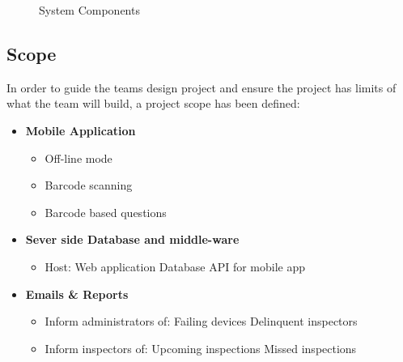 \documentclass[Letter,11pt]{article}
\begin{document}
	\begin{figure}[h]
		\centering
		
		\caption{\label{sysConn} System Components}
	\end{figure}
	
	\subsection{Scope}\label{scope}
	In order to guide the teams design project and ensure the project has limits of what the team will build, a project scope has been defined:
	\\
	\begin{minipage}[t]{0.5\textwidth}
		\begin{itemize}
			\item \textbf{Mobile Application}
			\begin{itemize}
				\item Off-line mode
				\item Barcode scanning
				\item Barcode based questions
			\end{itemize}
			\item \textbf{Sever side Database and middle-ware}
			\begin{itemize}
				\item Host:
					\subitem Web application
					\subitem Database API for mobile app
			\end{itemize}
			\item\textbf{ Emails \& Reports}
			\begin{itemize}
				\item Inform administrators of:
					\subitem Failing devices
					\subitem Delinquent inspectors
				\item Inform inspectors of:
					\subitem Upcoming inspections
					\subitem Missed inspections
			\end{itemize}
		\end{itemize}
	\end{minipage}
\end{document}
